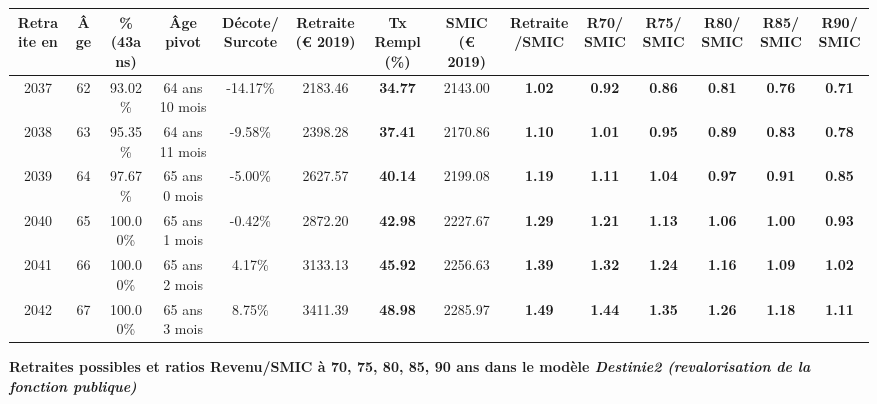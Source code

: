 \begin{adjustbox}{max width=\textwidth} 
\begin{tabular}[htb]{|c|c||c|c|c||c|c||c|c||c|c|c|c|c|} 
\hline 
 Retraite en &  Âge &  \%(43ans) &  Âge pivot &  Décote/Surcote &  Retraite (\euro{} 2019) &  Tx Rempl(\%) &  SMIC (\euro{} 2019) &  Retraite/SMIC &  R70/SMIC &  R75/SMIC &  R80/SMIC &  R85/SMIC &  R90/SMIC \\ 
\hline \hline 
 2037 &  62 &  93.02\% &  64 ans 10 mois &  -14.17\% &  2183.46 &  {\bf 34.77} &  2143.00 &  {\bf 1.02} &  {\bf {\color{red} 0.92}} &  {\bf {\color{red} 0.86}} &  {\bf {\color{red} 0.81}} &  {\bf {\color{red} 0.76}} &  {\bf {\color{red} 0.71}} \\ 
\hline 
 2038 &  63 &  95.35\% &  64 ans 11 mois &  -9.58\% &  2398.28 &  {\bf 37.41} &  2170.86 &  {\bf 1.10} &  {\bf 1.01} &  {\bf {\color{red} 0.95}} &  {\bf {\color{red} 0.89}} &  {\bf {\color{red} 0.83}} &  {\bf {\color{red} 0.78}} \\ 
\hline 
 2039 &  64 &  97.67\% &  65 ans 0 mois &  -5.00\% &  2627.57 &  {\bf 40.14} &  2199.08 &  {\bf 1.19} &  {\bf 1.11} &  {\bf 1.04} &  {\bf {\color{red} 0.97}} &  {\bf {\color{red} 0.91}} &  {\bf {\color{red} 0.85}} \\ 
\hline 
 2040 &  65 &  100.00\% &  65 ans 1 mois &  -0.42\% &  2872.20 &  {\bf 42.98} &  2227.67 &  {\bf 1.29} &  {\bf 1.21} &  {\bf 1.13} &  {\bf 1.06} &  {\bf {\color{red} 1.00}} &  {\bf {\color{red} 0.93}} \\ 
\hline 
 2041 &  66 &  100.00\% &  65 ans 2 mois &  4.17\% &  3133.13 &  {\bf 45.92} &  2256.63 &  {\bf 1.39} &  {\bf 1.32} &  {\bf 1.24} &  {\bf 1.16} &  {\bf 1.09} &  {\bf 1.02} \\ 
\hline 
 2042 &  67 &  100.00\% &  65 ans 3 mois &  8.75\% &  3411.39 &  {\bf 48.98} &  2285.97 &  {\bf 1.49} &  {\bf 1.44} &  {\bf 1.35} &  {\bf 1.26} &  {\bf 1.18} &  {\bf 1.11} \\ 
\hline 
\hline 
\end{tabular} 
\end{adjustbox} 
 
 \vspace{0.1cm} 
{\bf \noindent Retraites possibles et ratios Revenu/SMIC à 70, 75, 80, 85, 90 ans dans le modèle \emph{Destinie2 (revalorisation de la fonction publique)}}  
 
